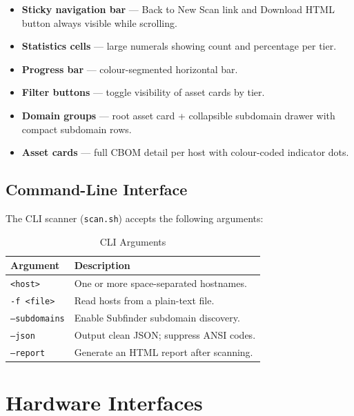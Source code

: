 \begin{itemize}[noitemsep]
  \item \textbf{Sticky navigation bar} — Back to New Scan link and Download HTML
        button always visible while scrolling.
  \item \textbf{Statistics cells} — large numerals showing count and percentage
        per tier.
  \item \textbf{Progress bar} — colour-segmented horizontal bar.
  \item \textbf{Filter buttons} — toggle visibility of asset cards by tier.
  \item \textbf{Domain groups} — root asset card + collapsible subdomain drawer
        with compact subdomain rows.
  \item \textbf{Asset cards} — full CBOM detail per host with colour-coded
        indicator dots.
\end{itemize}

\subsection{Command-Line Interface}

The CLI scanner (\texttt{scan.sh}) accepts the following arguments:

\begin{table}[H]
  \centering
  \caption{CLI Arguments}
  \label{tab:cli_args}
  \begin{tabularx}{\textwidth}{L{3.5cm} L{10cm}}
    \toprule
    \textbf{Argument} & \textbf{Description} \\
    \midrule
    \texttt{<host>}          & One or more space-separated hostnames. \\
    \texttt{-f <file>}       & Read hosts from a plain-text file. \\
    \texttt{--subdomains}    & Enable Subfinder subdomain discovery. \\
    \texttt{--json}          & Output clean JSON; suppress ANSI codes. \\
    \texttt{--report}        & Generate an HTML report after scanning. \\
    \bottomrule
  \end{tabularx}
\end{table}

\section{Hardware Interfaces}
\label{sec:hardware_interfaces}

